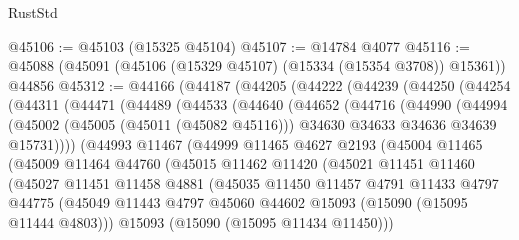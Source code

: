 \begin{lexlean}{RustStd}
\begin{coremodule}
@45106 := @45103 (@15325 @45104)
@45107 := @14784 @4077
@45116 := @45088 (@45091 (@45106 (@15329 @45107) (@15334 (@15354 @3708)) @15361)) @44856
@45312 := @44166
    (@44187
      (@44205
        (@44222
          (@44239
            (@44250
              (@44254
                (@44311
                  (@44471
                    (@44489
                      (@44533
                        (@44640
                          (@44652
                            (@44716
                              (@44990
                                (@44994
                                  (@45002
                                    (@45005 (@45011 (@45082 @45116)))
                                    @34630
                                    @34633
                                    @34636
                                    @34639
                                    @15731))))
                            (@44993
                              @11467
                              (@44999
                                @11465
                                @4627
                                @2193
                                (@45004
                                  @11465
                                  (@45009
                                    @11464
                                    @44760
                                    (@45015
                                      @11462
                                      @11420
                                      (@45021
                                        @11451
                                        @11460
                                        (@45027
                                          @11451
                                          @11458
                                          @4881
                                          (@45035
                                            @11450
                                            @11457
                                            @4791
                                            @11433
                                            @4797
                                            @44775
                                            (@45049
                                              @11443
                                              @4797
                                              @45060
                                              @44602
                                              @15093
                                              (@15090 (@15095 @11444 @4803)))
                                            @15093
                                            (@15090 (@15095 @11434 @11450)))

\end{coremodule}
\end{lexlean}
